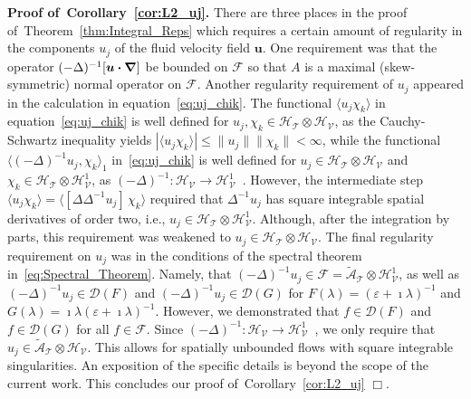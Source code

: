 \documentclass[leqno,onefignum,onetabnum]{siamltex1213}
\newcommand{\thmref}[1]{Theorem~\ref{#1}}
\newcommand{\corref}[1]{Corollary~\ref{#1}}
\newcommand{\Tc}{\mathcal{T}}
\newcommand{\Vc}{\mathcal{V}}
\newcommand{\Hs}{\mathscr{H}}
\newcommand{\As}{\mathscr{A}}
\newcommand{\Ds}{\mathscr{D}}
\newcommand{\Fs}{\mathscr{F}}
\newcommand\bnabla{\mbox{\boldmath${\nabla}$}}
\providecommand\bcdot{\boldsymbol{\cdot}}
\newcommand{\vecu}{\boldsymbol{u}}
\begin{document}
\textbf{Proof of~\corref{cor:L2_uj}.}\hspace{1ex}
%
There are three places in the proof of~\thmref{thm:Integral_Reps}
which requires a certain amount of regularity in the components $u_j$
of the fluid velocity field $\vecu$. One requirement was that the
operator 
$(-\Delta)^{-1}[\vecu\bcdot\bnabla]$ be bounded on $\Fs$ so that $A$ is a
maximal (skew-symmetric) normal operator on $\Fs$. Another regularity
requirement of $u_j$ appeared in the calculation in
equation~\eqref{eq:uj_chik}. The functional 
$\langle u_j\chi_k\rangle$ in equation~\eqref{eq:uj_chik} is well defined for
$u_j,\chi_k\in\Hs_{\Tc}\otimes\Hs_{\Vc}$, as the Cauchy-Schwartz inequality yields
$|\langle u_j\chi_k\rangle|\leq\|u_j\|\|\chi_k\|<\infty$, while the functional
$\langle(-\Delta)^{-1}u_j,\chi_k\rangle_1$ in~\eqref{eq:uj_chik} is well defined for
$u_j\in\Hs_{\Tc}\otimes\Hs_{\Vc}$ and $\chi_k\in\Hs_{\Tc}\otimes\Hs^1_{\Vc}$, as
$(-\Delta)^{-1}:\Hs_{\Vc}\to\Hs^1_{\Vc}$~\cite{Bhattacharya:AAP:1999:951}. However,
the intermediate step 
$\langle u_j\chi_k\rangle=\langle[\Delta\Delta^{-1}u_j]\,\chi_k\rangle$ required that $\Delta^{-1}u_j$ has square
integrable spatial derivatives of order two, i.e.,
$u_j\in\Hs_{\Tc}\otimes\Hs^1_{\Vc}$. Although, after the integration by parts,
this requirement was weakened to $u_j\in\Hs_{\Tc}\otimes\Hs_{\Vc}$. The final
regularity requirement on $u_j$ was in the conditions of the spectral
theorem in~\eqref{eq:Spectral_Theorem}. Namely, that
$(-\Delta)^{-1}u_j\in\Fs=\tilde{\As}_{\Tc}\otimes\Hs^1_{\Vc}$, as well as $(-\Delta)^{-1}u_j\in\Ds(F)$
and $(-\Delta)^{-1}u_j\in\Ds(G)$ for $F(\lambda)=(\varepsilon+\imath\lambda)^{-1}$ and
$G(\lambda)=\imath\lambda(\varepsilon+\imath\lambda)^{-1}$. However, we demonstrated that $f\in\Ds(F)$ and 
$f\in\Ds(G)$ for all $f\in\Fs$. Since
$(-\Delta)^{-1}:\Hs_{\Vc}\to\Hs^1_{\Vc}$~\cite{Bhattacharya:AAP:1999:951}, 
we only require that $u_j\in\tilde{\As}_{\Tc}\otimes\Hs_{\Vc}$.  This allows for
spatially unbounded flows with square integrable singularities. An
exposition of the specific details is beyond the scope of the current
work. This concludes our proof of~\corref{cor:L2_uj} $\Box$. 
\end{document}

